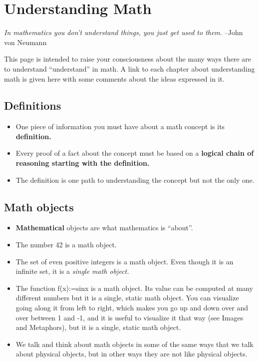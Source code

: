 \section{Understanding Math}
    \textit{In mathematics you don’t understand things, you just get used to them.}
    –John von Neumann

    This page is intended to raise your consciousness about the many ways there are
    to understand “understand” in math. A link to each chapter about understanding
    math is given here with some comments about the ideas expressed in it.

    \subsection{Definitions}
        \begin{itemize}
            \item{One piece of information you must have about a math concept is its \textbf{definition.}}

            \item{Every proof of a fact about the concept must be based on a
                \textbf{logical chain of reasoning starting with the definition.}}

            \item{The definition is one path to understanding the concept but not the only one.}
        \end{itemize}

    \subsection{Math objects}
        \begin{itemize}
            \item{\textbf{Mathematical} objects are what mathematics is “about”.}

            \item{The number 42 is a math object.}

            \item{The set of even positive integers is a math object.
                  Even though it is an infinite set, it is a \textit{single math object.}}

            \item{The function f(x):=sinx is a math object. Its value can be
                  computed at many different numbers but it is a single, static
                  math object. You can visualize going along it from left to right,
                  which makes you go up and down over and over between 1 and -1, and it
                  is useful to visualize it that way (see Images and Metaphors), but it is a
                  single, static math object.}

            \item{We talk and think about math objects in some of the same ways
                  that we talk about physical objects, but in other ways they are
                  not like physical objects.}
        \end{itemize}
